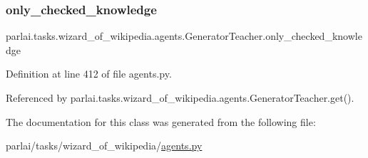 \subsubsection{\texorpdfstring{only\+\_\+checked\+\_\+knowledge}{only\_checked\_knowledge}}
{\footnotesize\ttfamily parlai.\+tasks.\+wizard\+\_\+of\+\_\+wikipedia.\+agents.\+Generator\+Teacher.\+only\+\_\+checked\+\_\+knowledge}



Definition at line 412 of file agents.\+py.



Referenced by parlai.\+tasks.\+wizard\+\_\+of\+\_\+wikipedia.\+agents.\+Generator\+Teacher.\+get().



The documentation for this class was generated from the following file\+:\begin{DoxyCompactItemize}
\item 
parlai/tasks/wizard\+\_\+of\+\_\+wikipedia/\hyperlink{parlai_2tasks_2wizard__of__wikipedia_2agents_8py}{agents.\+py}\end{DoxyCompactItemize}
